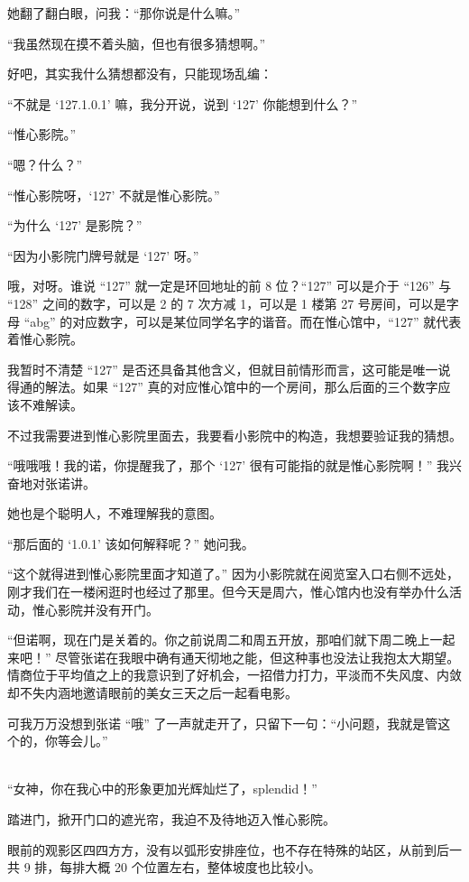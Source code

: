 \documentclass[UTF8]{ctexart}
\begin{document}
她翻了翻白眼，问我：“那你说是什么嘛。”

“我虽然现在摸不着头脑，但也有很多猜想啊。”

好吧，其实我什么猜想都没有，只能现场乱编：

“不就是 ‘127.1.0.1’ 嘛，我分开说，说到 ‘127’ 你能想到什么？”

“惟心影院。”

“嗯？什么？”

“惟心影院呀，‘127’ 不就是惟心影院。”

“为什么 ‘127’ 是影院？”

“因为小影院门牌号就是 ‘127’ 呀。”

哦，对呀。谁说 “127” 就一定是环回地址的前 8 位？“127” 可以是介于 “126” 与 “128” 之间的数字，可以是 2 的 7 次方减 1，可以是 1 楼第 27 号房间，可以是字母 “abg” 的对应数字，可以是某位同学名字的谐音。而在惟心馆中，“127” 就代表着惟心影院。

我暂时不清楚 “127” 是否还具备其他含义，但就目前情形而言，这可能是唯一说得通的解法。如果 “127” 真的对应惟心馆中的一个房间，那么后面的三个数字应该不难解读。

不过我需要进到惟心影院里面去，我要看小影院中的构造，我想要验证我的猜想。

“哦哦哦！我的诺，你提醒我了，那个 ‘127’ 很有可能指的就是惟心影院啊！” 我兴奋地对张诺讲。

她也是个聪明人，不难理解我的意图。

“那后面的 ‘1.0.1’ 该如何解释呢？” 她问我。

“这个就得进到惟心影院里面才知道了。” 因为小影院就在阅览室入口右侧不远处，刚才我们在一楼闲逛时也经过了那里。但今天是周六，惟心馆内也没有举办什么活动，惟心影院并没有开门。

“但诺啊，现在门是关着的。你之前说周二和周五开放，那咱们就下周二晚上一起来吧！” 尽管张诺在我眼中确有通天彻地之能，但这种事也没法让我抱太大期望。情商位于平均值之上的我意识到了好机会，一招借力打力，平淡而不失风度、内敛却不失内涵地邀请眼前的美女三天之后一起看电影。

可我万万没想到张诺 “哦” 了一声就走开了，只留下一句：“小问题，我就是管这个的，你等会儿。”

~\\

“女神，你在我心中的形象更加光辉灿烂了，splendid！”

踏进门，掀开门口的遮光帘，我迫不及待地迈入惟心影院。

眼前的观影区四四方方，没有以弧形安排座位，也不存在特殊的站区，从前到后一共 9 排，每排大概 20 个位置左右，整体坡度也比较小。
\end{document}
